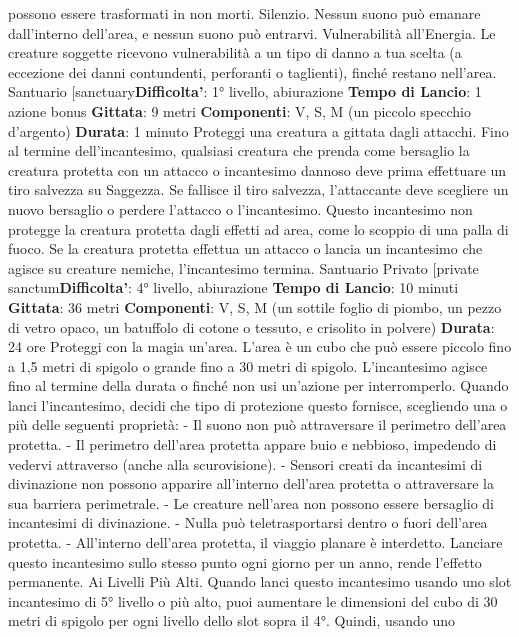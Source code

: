 \begin{multicols}{2}
possono essere trasformati in non morti.
Silenzio. Nessun suono può emanare dall’interno
dell’area, e nessun suono può entrarvi.
Vulnerabilità all’Energia. Le creature soggette
ricevono vulnerabilità a un tipo di danno a tua scelta (a
eccezione dei danni contundenti, perforanti o taglienti),
finché restano nell’area.
Santuario
[sanctuary\textbf{Difficolta'}:
1° livello, abiurazione
\textbf{Tempo di Lancio}: 1 azione bonus
\textbf{Gittata}: 9 metri
\textbf{Componenti}: V, S, M (un piccolo specchio d’argento)
\textbf{Durata}: 1 minuto
Proteggi una creatura a gittata dagli attacchi. Fino al
termine dell’incantesimo, qualsiasi creatura che prenda
come bersaglio la creatura protetta con un attacco o
incantesimo dannoso deve prima effettuare un tiro
salvezza su Saggezza. Se fallisce il tiro salvezza,
l’attaccante deve scegliere un nuovo bersaglio o
perdere l’attacco o l’incantesimo. Questo incantesimo
non protegge la creatura protetta dagli effetti ad area,
come lo scoppio di una palla di fuoco.
Se la creatura protetta effettua un attacco o lancia un
incantesimo che agisce su creature nemiche,
l’incantesimo termina.
Santuario Privato
[private sanctum\textbf{Difficolta'}:
4° livello, abiurazione
\textbf{Tempo di Lancio}: 10 minuti
\textbf{Gittata}: 36 metri
\textbf{Componenti}: V, S, M (un sottile foglio di piombo, un
pezzo di vetro opaco, un batuffolo di cotone o tessuto, e
crisolito in polvere)
\textbf{Durata}: 24 ore
Proteggi con la magia un’area. L’area è un cubo che
può essere piccolo fino a 1,5 metri di spigolo o grande
fino a 30 metri di spigolo. L’incantesimo agisce fino al
termine della durata o finché non usi un’azione per
interromperlo.
Quando lanci l’incantesimo, decidi che tipo di
protezione questo fornisce, scegliendo una o più delle
seguenti proprietà:
- Il suono non può attraversare il perimetro dell’area
protetta.
- Il perimetro dell’area protetta appare buio e
nebbioso, impedendo di vedervi attraverso (anche
alla scurovisione).
- Sensori creati da incantesimi di divinazione non
possono apparire all’interno dell’area protetta o
attraversare la sua barriera perimetrale.
- Le creature nell’area non possono essere bersaglio
di incantesimi di divinazione.
- Nulla può teletrasportarsi dentro o fuori dell’area
protetta.
- All’interno dell’area protetta, il viaggio planare è
interdetto.
Lanciare questo incantesimo sullo stesso punto ogni
giorno per un anno, rende l’effetto permanente.
Ai Livelli Più Alti. Quando lanci questo incantesimo
usando uno slot incantesimo di 5° livello o più alto, puoi
aumentare le dimensioni del cubo di 30 metri di spigolo
per ogni livello dello slot sopra il 4°. Quindi, usando uno

\end{multicols}
